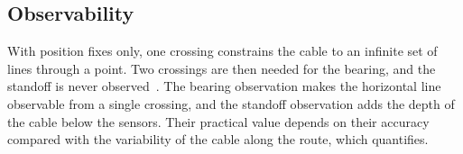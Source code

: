 \subsection{Observability}\label{subsec:observability}

With position fixes only, one crossing constrains the cable to an infinite set of lines through a point. Two crossings are then needed for the bearing, and the standoff is never observed~\cite{bharti2020semi}. The bearing observation makes the horizontal line observable from a single crossing, and the standoff observation adds the depth of the cable below the sensors. Their practical value depends on their accuracy compared with the variability of the cable along the route, which  quantifies.

